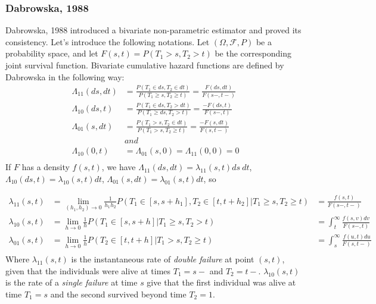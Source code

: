 \documentclass[]{article}
\begin{document}
\subsubsection{Dabrowska, 1988 \cite{dabrowska1988kaplan}}
Dabrowska, 1988 \cite{dabrowska1988kaplan} introduced a bivariate non-parametric estimator and proved its consistency. Let's introduce the following notations.
Let $(\Omega, \mathcal{F}, P)$ be a probability space, and let $F(s,t) = P(T_1>s, T_2>t)$ be the corresponding joint survival function. Bivariate cumulative hazard functions are defined by Dabrowska in the following way:
	$$
	\begin{aligned}
		\Lambda_{11}(ds,dt) &= \frac{P(T_1 \in ds, T_2\in dt)}{P(T_1 \geq s, T_2 \geq t)} = \frac{F(ds, dt)}{F(s-, t-)}\\
		\Lambda_{10}(ds,t) &= \frac{P(T_1 \in ds, T_2 > dt)}{P(T_1 \geq ds, T_2 > t)} = \frac{-F(ds, t)}{F(s-, t)}\\ %
		\Lambda_{01}(s,dt) &= \frac{P(T_1 > s, T_2\in dt)}{P(T_1 > s, T_2 \geq t)} = \frac{-F(s, dt)}{F(s, t-)}\\
		&and\\
		\Lambda_{10}(0,t) &= \Lambda_{01}(s,0) = \Lambda_{11}(0,0) = 0\\
	\end{aligned}
	$$
If $F$ has a density $f(s,t)$, we have $\Lambda_{11}(ds,dt) = \lambda_{11}(s,t)ds~dt$, $\Lambda_{10}(ds,t) = \lambda_{10}(s,t)dt$, $\Lambda_{01}(s,dt) = \lambda_{01}(s,t)dt$, so

	$$
	\begin{aligned}
		\lambda_{11}(s,t) &= \lim_{(h_1,h_2)\rightarrow 0} \frac{1}{h_1 h_2} P(T_1\in[s,s+h_1], T_2\in[t,t+h_2] | T_1\geq s, T_2 \geq t) & = \frac{f(s,t)}{F(s-, t-)}\\
		\lambda_{10}(s,t) &= \lim_{h\rightarrow 0} \frac{1}{h} P(T_1\in[s,s+h] | T_1\geq s, T_2 > t) & = \int_t^{\infty} \frac{f(s,v)dv}{F(s-, t)}\\
		\lambda_{01}(s,t) &= \lim_{h\rightarrow 0} \frac{1}{h} P(T_2\in[t,t+h] | T_1 > s, T_2 \geq t) & = \int_s^{\infty} \frac{f(u,t)du}{F(s, t-)}\\
	\end{aligned}
	$$
Where $\lambda_{11}(s,t)$ is the instantaneous rate of \emph{double failure} at point $(s,t)$, given that the individuals were alive at times $T_1=s-$ and $T_2 = t-$. $\lambda_{10}(s, t)$ is the rate of a \emph{single failure} at time $s$ give that the first individual was alive at time $T_1=s$ and the second survived beyond time $T_2 = 1$.\\
\end{document}
